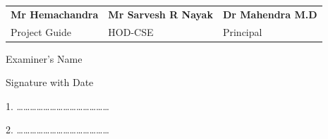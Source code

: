 \documentclass[12pt,a4paper]{report}
\begin{document}
\par
\vspace{0.55in}

\begin{tabularx}{0.95\textwidth}{ 
   >{\raggedright\arraybackslash}X 
   >{\centering\arraybackslash}X 
   >{\raggedleft\arraybackslash}X }
     \textbf{Mr Hemachandra} & \textbf{Mr Sarvesh R Nayak} & \textbf{Dr Mahendra M.D} \\
     \centering Project Guide & \centering HOD-CSE & \centering Principal \\
\end{tabularx}



\hspace{7.5cm}

\begin{flushleft}
\begin{normalsize}Examiner's Name \end{normalsize}
\hspace{7.5cm}
\begin{normalsize}Signature with Date\end{normalsize}
\end{flushleft}


\begin{flushleft}
1. \ldots\ldots\ldots\ldots\ldots\ldots \ldots \hspace{6.8cm}\ldots\ldots\ldots\ldots \ldots\ldots\ldots 
\par
\vspace{0.2in}	
2. \ldots\ldots\ldots\ldots\ldots\ldots \ldots \hspace{6.8cm}\ldots\ldots\ldots\ldots \ldots\ldots\ldots 
\end{flushleft}
\newpage


\newpage
{}
\end{document}
